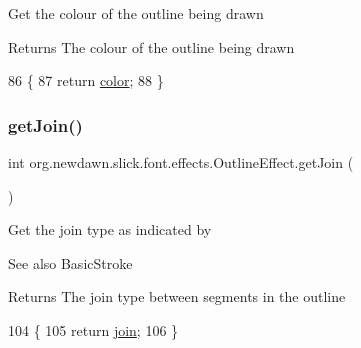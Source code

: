 Get the colour of the outline being drawn

\begin{DoxyReturn}{Returns}
The colour of the outline being drawn 
\end{DoxyReturn}

\begin{DoxyCode}
86                             \{
87         \textcolor{keywordflow}{return} \mbox{\hyperlink{classorg_1_1newdawn_1_1slick_1_1font_1_1effects_1_1_outline_effect_a00160c4c005cb659d45c135a2798005f}{color}};
88     \}
\end{DoxyCode}
\mbox{\label{classorg_1_1newdawn_1_1slick_1_1font_1_1effects_1_1_outline_effect_a495949cd03000b18b0d3907596afeb53}} 
\subsubsection{\texorpdfstring{get\+Join()}{getJoin()}}
{\footnotesize\ttfamily int org.\+newdawn.\+slick.\+font.\+effects.\+Outline\+Effect.\+get\+Join (\begin{DoxyParamCaption}{ }\end{DoxyParamCaption})\hspace{0.3cm}{\ttfamily [inline]}}

Get the join type as indicated by \begin{DoxySeeAlso}{See also}
Basic\+Stroke
\end{DoxySeeAlso}
\begin{DoxyReturn}{Returns}
The join type between segments in the outline 
\end{DoxyReturn}

\begin{DoxyCode}
104                          \{
105         \textcolor{keywordflow}{return} \mbox{\hyperlink{classorg_1_1newdawn_1_1slick_1_1font_1_1effects_1_1_outline_effect_a913a20571098d37c45f5aff95ff844f9}{join}};
106     \}
\end{DoxyCode}
\mbox{\label{classorg_1_1newdawn_1_1slick_1_1font_1_1effects_1_1_outline_effect_a07b01aefe35fa2cefeb844fdb68745e9}} 
